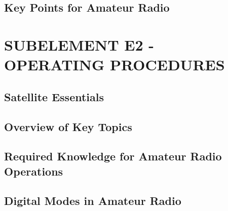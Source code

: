 \documentclass[12pt]{book}
\begin{document}
\section{Key Points for Amateur Radio}











\chapter{SUBELEMENT E2 - OPERATING PROCEDURES}
\section{Satellite Essentials}












\section{Overview of Key Topics}












\section{Required Knowledge for Amateur Radio Operations}












\section{Digital Modes in Amateur Radio}











\end{document}
